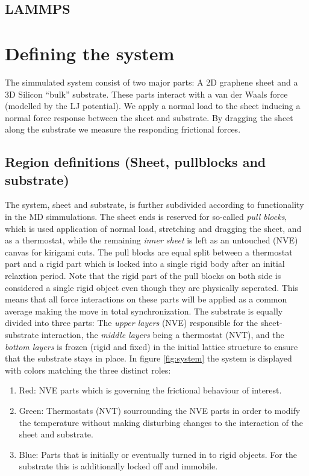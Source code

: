 \subsection{LAMMPS}


\section{Defining the system}

The simmulated system consist of two major parts: A 2D graphene sheet and a 3D Silicon ``bulk'' substrate. These parts interact with a van der Waals force (modelled by the LJ potential). We apply a normal load to the sheet inducing a normal force response between the sheet and substrate. By dragging the sheet along the substrate we measure the responding frictional forces.


\subsection{Region definitions (Sheet, pullblocks and substrate)}

The system, sheet and substrate, is further subdivided according to
functionality in the MD simmulations. The sheet ends is reserved for so-called
\textit{pull blocks}, which is used application of normal load, stretching and
dragging the sheet, and as a thermostat, while the remaining \textit{inner
sheet} is left as an untouched (NVE) canvas for kirigami cuts. The pull blocks
are equal split between a thermostat part and a rigid part which is locked into
a single rigid body after an initial relaxtion period. Note that the rigid part
of the pull blocks on both side is considered a single rigid object even though
they are physically seperated. This means that all force interactions on these
parts will be applied as a common average making the move in total
synchronization. The substrate is equally divided into three parts: The
\textit{upper layers} (NVE) responsible for the sheet-substrate interaction, the
\textit{middle layers} being a thermostat (NVT), and the \textit{bottom layers}
is frozen (rigid and fixed) in the initial lattice structure to ensure that the
substrate stays in place. In figure \ref{fig:system} the system is displayed
with colors matching the three distinct roles:
\begin{enumerate}
  \item Red: NVE parts which is governing the frictional behaviour of interest.
  \item Green: Thermostats (NVT) sourrounding the NVE parts in order to modify the temperature without making disturbing changes to the interaction of the sheet and substrate.
  \item Blue: Parts that is initially or eventually turned in to rigid objects. For the substrate this is additionally locked off and immobile. 
\end{enumerate}

